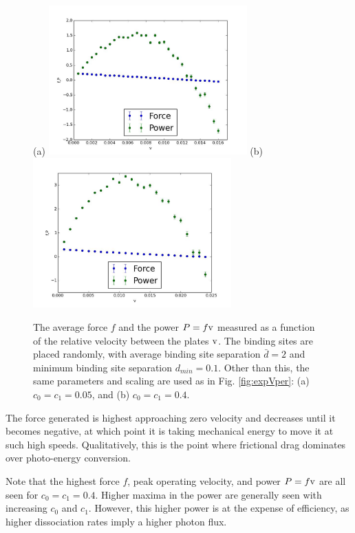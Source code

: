 \documentclass[journal = mamobx, manuscript = article]{achemso}
\begin{document}
\begin{figure}[htp]
\begin{center}
(a)
\includegraphics[width=3in]{0505rand}
(b)
\includegraphics[width=3in]{4040rand}
\caption{
The average force $f$ and the power $P=f {\rm v}$ measured as a function of the relative velocity between the plates $\rm v$. The binding sites are placed randomly, with average binding site separation $\bar d = 2$ and minimum binding site separation $d_{min}=0.1$. Other than this, the same parameters and scaling are used as in Fig. \ref{fig:expVper}: (a) $c_0=c_1= 0.05$, and (b) $c_0=c_1= 0.4$.
}
\label{fig:expVrand}
\end{center}
\end{figure}

The force generated is highest approaching zero velocity and decreases until it
becomes negative, at which point it is taking mechanical energy to move it at
such high speeds. Qualitatively, this is the point where frictional drag
dominates over photo-energy conversion.

Note that the highest force $f$, peak operating velocity, and power $P=f{\rm v}$ are all seen for $c_0 = c_1 = 0.4$. Higher maxima in the power are generally seen with increasing $c_0$ and $c_1$. However, this higher power is at the expense of efficiency, as higher
dissociation rates imply a higher photon flux.
\end{document}
